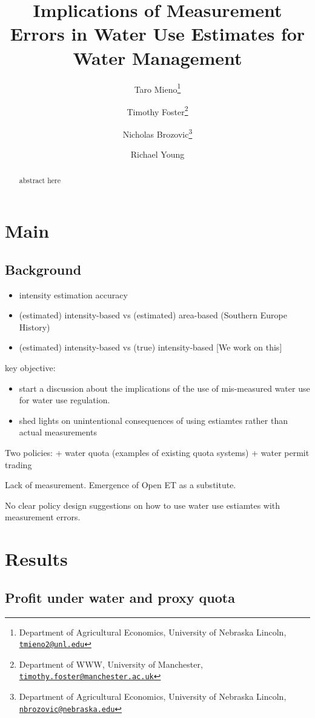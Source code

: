 \documentclass[
]{article}
\title{Implications of Measurement Errors in Water Use Estimates for Water Management}
\author{Taro Mieno\footnote{Department of Agricultural Economics, University of Nebraska Lincoln, \href{mailto:tmieno2@unl.edu}{\nolinkurl{tmieno2@unl.edu}}} \and Timothy Foster\footnote{Department of WWW, University of Manchester, \href{mailto:timothy.foster@manchester.ac.uk}{\nolinkurl{timothy.foster@manchester.ac.uk}}} \and Nicholas Brozovic\footnote{Department of Agricultural Economics, University of Nebraska Lincoln, \href{mailto:nbrozovic@nebraska.edu}{\nolinkurl{nbrozovic@nebraska.edu}}} \and Richael Young}
\date{}
\providecommand{\tightlist}{%
  \setlength{\itemsep}{0pt}\setlength{\parskip}{0pt}}
\begin{document}
\maketitle
\begin{abstract}
abstract here
\end{abstract}

\section{Main}\label{main}

\subsection{Background}\label{background}

\begin{itemize}
\tightlist
\item
  intensity estimation accuracy
\item
  (estimated) intensity-based vs (estimated) area-based (Southern Europe History)
\item
  (estimated) intensity-based vs (true) intensity-based {[}We work on this{]}
\end{itemize}

key objective:

\begin{itemize}
\item
  start a discussion about the implications of the use of mis-measured water use for water use regulation.
\item
  shed lights on unintentional consequences of using estiamtes rather than actual measurements
\end{itemize}

Two policies:
+ water quota (examples of existing quota systems)
+ water permit trading

Lack of measurement. Emergence of Open ET as a substitute.

No clear policy design suggestions on how to use water use estiamtes with measurement errors.

\section{Results}\label{results}

\subsection{Profit under water and proxy quota}\label{profit-under-water-and-proxy-quota}
\end{document}
